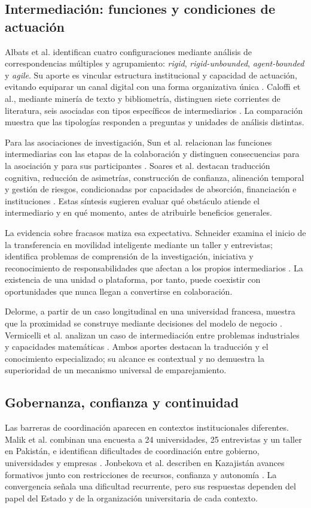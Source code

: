 \documentclass[12pt,twocolumn]{article}
\begin{document}
\subsection{Intermediación: funciones y condiciones de actuación}
Albats et al. identifican cuatro configuraciones mediante análisis de correspondencias múltiples y agrupamiento: \textit{rigid}, \textit{rigid-unbounded}, \textit{agent-bounded} y \textit{agile}. Su aporte es vincular estructura institucional y capacidad de actuación, evitando equiparar un canal digital con una forma organizativa única \cite{albats2022}. Caloffi et al., mediante minería de texto y bibliometría, distinguen siete corrientes de literatura, seis asociadas con tipos específicos de intermediarios \cite{caloffi2023}. La comparación muestra que las tipologías responden a preguntas y unidades de análisis distintas.

Para las asociaciones de investigación, Sun et al. relacionan las funciones intermediarias con las etapas de la colaboración y distinguen consecuencias para la asociación y para sus participantes \cite{sun2025}. Soares et al. destacan traducción cognitiva, reducción de asimetrías, construcción de confianza, alineación temporal y gestión de riesgos, condicionadas por capacidades de absorción, financiación e instituciones \cite{soares2026}. Estas síntesis sugieren evaluar qué obstáculo atiende el intermediario y en qué momento, antes de atribuirle beneficios generales.

La evidencia sobre fracasos matiza esa expectativa. Schneider examina el inicio de la transferencia en movilidad inteligente mediante un taller y entrevistas; identifica problemas de comprensión de la investigación, iniciativa y reconocimiento de responsabilidades que afectan a los propios intermediarios \cite{schneider2024}. La existencia de una unidad o plataforma, por tanto, puede coexistir con oportunidades que nunca llegan a convertirse en colaboración.

Delorme, a partir de un caso longitudinal en una universidad francesa, muestra que la proximidad se construye mediante decisiones del modelo de negocio \cite{delorme2023}. Vermicelli et al. analizan un caso de intermediación entre problemas industriales y capacidades matemáticas \cite{vermicelli2025}. Ambos aportes destacan la traducción y el conocimiento especializado; su alcance es contextual y no demuestra la superioridad de un mecanismo universal de emparejamiento.

\subsection{Gobernanza, confianza y continuidad}
Las barreras de coordinación aparecen en contextos institucionales diferentes. Malik et al. combinan una encuesta a 24 universidades, 25 entrevistas y un taller en Pakistán, e identifican dificultades de coordinación entre gobierno, universidades y empresas \cite{malik2021}. Jonbekova et al. describen en Kazajistán avances formativos junto con restricciones de recursos, confianza y autonomía \cite{jonbekova2025}. La convergencia señala una dificultad recurrente, pero sus respuestas dependen del papel del Estado y de la organización universitaria de cada contexto.
\end{document}
